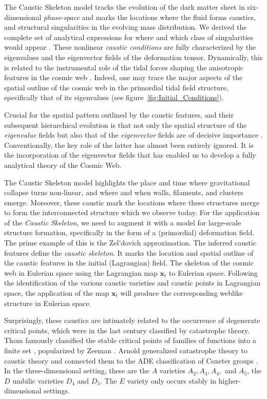 \documentclass[a4paper, 11pt]{article}
\begin{document}
The Caustic Skeleton model tracks the evolution of the dark matter sheet in six-dimen\-sional \textit{phase}-\textit{space} and marks the locations where the fluid forms caustics, and structural singularities in the evolving mass distribution. We derived the complete set of analytical expressions for where and which class of singularities would appear \cite{Feldbrugge:2018}. These nonlinear {\it caustic conditions} are fully characterized by the eigenvalues and the eigenvector fields of the deformation tensor. Dynamically, this is related to the instrumental role of the tidal forces shaping the anisotropic features in the cosmic web \cite[see e.g.][]{Weygaert:2008}. Indeed, one may trace the major aspects of the spatial outline of the cosmic web in the primordial tidal field structure, specifically that of its eigenvalues (see figure~\ref{fig:Initial_Conditions}).

Crucial for the spatial pattern outlined by the caustic features, and their subsequent hierarchical evolution is that not only the spatial structure of the {\it eigenvalue} fields but also that of the {\it eigenvector} fields are of decisive importance \cite{Feldbrugge:2018}. Conventionally, the key role of the latter has almost been entirely ignored. It is the incorporation of the eigenvector fields that has enabled us to develop a fully analytical theory of the Cosmic Web. 

The Caustic Skeleton model highlights the place and time where gravitational collapse turns non-linear, and where and when walls, filaments, and clusters emerge. Moreover, these caustic mark the locations where these structures merge to form the interconnected structure which we observe today. For the application of the \textit{Caustic Skeleton}, we need to augment it with a model for large-scale structure formation, specifically in the form of a (primordial) deformation field. The prime example of this is the Zel'dovich approximation. The inferred caustic features define the \textit{caustic skeleton}. It marks the location and spatial outline of the caustic features in the initial (Lagrangian) field. The skeleton of the cosmic web in Eulerian space using the Lagrangian map $\bm{x}_t$ to Eulerian space. Following the identification of the various caustic varieties and caustic points in Lagrangian space, the application of the map $\bm{x}_t$ will produce the corresponding weblike structure in Eulerian space. 

\bigskip
Surprisingly, these caustics are intimately related to the occurrence of degenerate critical points, which were in the last century classified by catastrophe theory. Thom famously classified the stable critical points of families of functions into a finite set \cite{Thom:1975}, popularized by Zeeman \cite{Zeeman:1972}. Arnold generalized catastrophe theory to caustic theory and connected them to the ADE classification of Coxeter groups \cite{Arnold:1972,Arnold:1976,Arnold:1984}. In the three-dimensional setting, these are the $A$ varieties $A_2,A_3,A_4,$ and $A_5$, the $D$ umbilic varieties $D_4$ and $D_5$. The $E$ variety only occurs stably in higher-dimensional settings.
\end{document}
